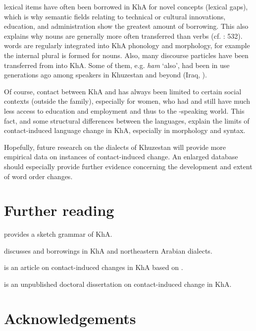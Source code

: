 \documentclass[output=paper,nonflat]{langsci/langscibook}
\begin{document}
 lexical items have often been borrowed in KhA for novel concepts (lexical gaps), which is why semantic fields relating to technical or cultural innovations, education, and administration show the greatest amount of  borrowing. This also explains why nouns are generally more often transferred than verbs (cf. \citealt{Lucas2015}: 532).  words are regularly integrated into KhA phonology and morphology, for example the  {internal plural} is formed for  nouns. Also, many discourse particles have been transferred from  into KhA. Some of them, e.g. \textit{ham} ‘also’, had been in use generations ago among  speakers in Khuzestan and beyond (Iraq, ).

Of course, contact between KhA and  has always been limited to certain social contexts (outside the family), especially for women, who had and still have much less access to education and employment and thus to the -speaking world. This fact, and some structural differences between the languages, explain the limits of contact-induced {language change} in KhA, especially in morphology and syntax.

Hopefully, {future} research on the dialects of Khuzestan will provide more empirical data on instances of contact-induced change. An enlarged database should especially provide further evidence concerning the development and extent of {word order} changes.

\section*{Further reading}

\begin{furtherreading}
\item \citet{Ingham2011khuz} provides a sketch grammar of KhA.
\item \citet{Ingham2005} discusses  and  borrowings in KhA and northeastern Arabian dialects.
\item \citet{MatrasShabibi2007} is an {article} on contact-induced changes in KhA based on \citet{Shabibi2006}.
\item \citet{Shabibi2006} is an unpublished doctoral dissertation on contact-induced change in KhA.
\end{furtherreading}

\section*{Acknowledgements}
\end{document}
